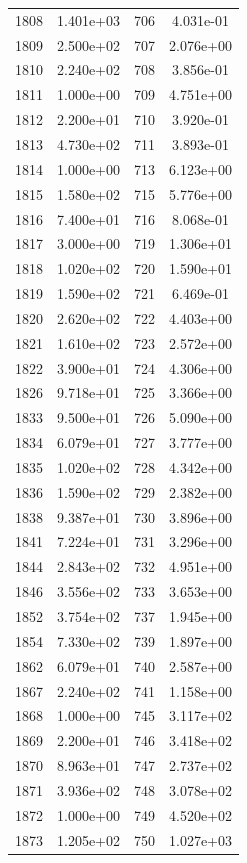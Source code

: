 \documentclass[12pt]{article}
\begin{document}
\begin{longtable}{@{}cccc@{}}
1808 & 1.401e+03 & 706 & 4.031e-01 \\
1809 & 2.500e+02 & 707 & 2.076e+00 \\
1810 & 2.240e+02 & 708 & 3.856e-01 \\
1811 & 1.000e+00 & 709 & 4.751e+00 \\
1812 & 2.200e+01 & 710 & 3.920e-01 \\
1813 & 4.730e+02 & 711 & 3.893e-01 \\
1814 & 1.000e+00 & 713 & 6.123e+00 \\
1815 & 1.580e+02 & 715 & 5.776e+00 \\
1816 & 7.400e+01 & 716 & 8.068e-01 \\
1817 & 3.000e+00 & 719 & 1.306e+01 \\
1818 & 1.020e+02 & 720 & 1.590e+01 \\
1819 & 1.590e+02 & 721 & 6.469e-01 \\
1820 & 2.620e+02 & 722 & 4.403e+00 \\
1821 & 1.610e+02 & 723 & 2.572e+00 \\
1822 & 3.900e+01 & 724 & 4.306e+00 \\
1826 & 9.718e+01 & 725 & 3.366e+00 \\
1833 & 9.500e+01 & 726 & 5.090e+00 \\
1834 & 6.079e+01 & 727 & 3.777e+00 \\
1835 & 1.020e+02 & 728 & 4.342e+00 \\
1836 & 1.590e+02 & 729 & 2.382e+00 \\
1838 & 9.387e+01 & 730 & 3.896e+00 \\
1841 & 7.224e+01 & 731 & 3.296e+00 \\
1844 & 2.843e+02 & 732 & 4.951e+00 \\
1846 & 3.556e+02 & 733 & 3.653e+00 \\
1852 & 3.754e+02 & 737 & 1.945e+00 \\
1854 & 7.330e+02 & 739 & 1.897e+00 \\
1862 & 6.079e+01 & 740 & 2.587e+00 \\
1867 & 2.240e+02 & 741 & 1.158e+00 \\
1868 & 1.000e+00 & 745 & 3.117e+02 \\
1869 & 2.200e+01 & 746 & 3.418e+02 \\
1870 & 8.963e+01 & 747 & 2.737e+02 \\
1871 & 3.936e+02 & 748 & 3.078e+02 \\
1872 & 1.000e+00 & 749 & 4.520e+02 \\
1873 & 1.205e+02 & 750 & 1.027e+03 \\

\end{longtable}
\end{document}
